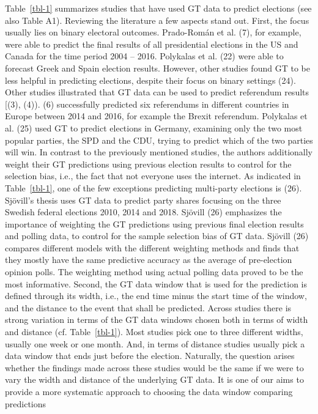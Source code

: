 \documentclass[
  letterpaper,
  DIV=11,
  numbers=noendperiod]{scrartcl}
\begin{document}
Table~\ref{tbl-1} summarizes studies that have used GT data to predict
elections (see also Table A1). Reviewing the literature a few aspects
stand out. First, the focus usually lies on binary electoral outcomes.
Prado-Román et al. (7), for example, were able to predict the ﬁnal
results of all presidential elections in the US and Canada for the time
period 2004 -- 2016. Polykalas et al. (22) were able to forecast Greek
and Spain election results. However, other studies found GT to be less
helpful in predicting elections, despite their focus on binary settings
(24). Other studies illustrated that GT data can be used to predict
referendum results {[}(3), (4)). (6) successfully predicted six
referendums in different countries in Europe between 2014 and 2016, for
example the Brexit referendum. Polykalas et al. (25) used GT to predict
elections in Germany, examining only the two most popular parties, the
SPD and the CDU, trying to predict which of the two parties will win. In
contrast to the previously mentioned studies, the authors additionally
weight their GT predictions using previous election results to control
for the selection bias, i.e., the fact that not everyone uses the
internet. As indicated in Table~\ref{tbl-1}, one of the few exceptions
predicting multi-party elections is (26). Sjövill's thesis uses GT data
to predict party shares focusing on the three Swedish federal elections
2010, 2014 and 2018. Sjövill (26) emphasizes the importance of weighting
the GT predictions using previous ﬁnal election results and polling
data, to control for the sample selection bias of GT data. Sjövill (26)
compares diﬀerent models with the diﬀerent weighting methods and finds
that they mostly have the same predictive accuracy as the average of
pre-election opinion polls. The weighting method using actual polling
data proved to be the most informative. Second, the GT data window that
is used for the prediction is defined through its width, i.e., the end
time minus the start time of the window, and the distance to the event
that shall be predicted. Across studies there is strong variation in
terms of the GT data windows chosen both in terms of width and distance
(cf. Table~\ref{tbl-1}). Most studies pick one to three different
widths, usually one week or one month. And, in terms of distance studies
usually pick a data window that ends just before the election.
Naturally, the question arises whether the findings made across these
studies would be the same if we were to vary the width and distance of
the underlying GT data. It is one of our aims to provide a more
systematic approach to choosing the data window comparing predictions
\end{document}

